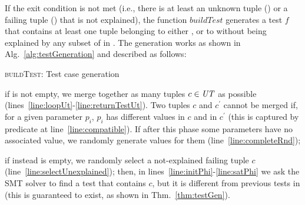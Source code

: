 \begin{tikzborder}{\cite{Gargantini16:validation}}
\begin{tikzborder}{\cite{gargantini_combinatorial_2017}}
\begin{tikzborder}{\cite{garn2019}}
\begin{tikzborder}{\cite{arcaini2019achieving}}
\begin{tikzborder}{}
If the exit condition is not met (i.e., there is at least an unknown tuple (\ut) or a failing tuple (\ft) that is not explained), the function $\mathit{buildTest}$ generates a test $f$ that contains at least one tuple belonging to either \ut, or to \ft without being explained by any subset of \mfics in \isoMficsSet. The generation works as shown in Alg.~\ref{alg:testGeneration} and described as follows:
\end{tikzborder}
%
\begin{algorithm}[!htb]
	\begin{algorithmic}[1]
		\If{$\ut \neq \emptyset$}
		\label{line:loopUt}
		\label{line:compatible}
		\EndIf
		\State {}
		\EndIf
		\EndFor
		\label{line:completeRnd}
		\State {}\label{line:returnTestUt}
		\Else
		\label{line:selectUnexplained}
		\label{line:initPhi}
		\label{line:satPhi}
		\EndIf
	\end{algorithmic}
	\caption{\textsc{buildTest}: Test case generation}
	\label{alg:testGeneration}
\end{algorithm}
%
\begin{tikzborder}{}
\begin{compactitem}
	\item if \ut is not empty, we merge together as many tuples $c \in \mathit{UT}$ as possible (lines~\ref{line:loopUt}-\ref{line:returnTestUt}). Two tuples $c$ and $c^\prime$ cannot be merged if, for a given parameter $p_i$, $p_i$ has different values in $c$ and in $c^\prime$ (this is captured by predicate \compatible at line~\ref{line:compatible}). If after this phase some parameters have no associated value, we randomly generate values for them (line~\ref{line:completeRnd});
	\item if instead \ut is empty, we randomly select a not-explained failing tuple $c$ (line~\ref{line:selectUnexplained}); then, in lines~\ref{line:initPhi}-\ref{line:satPhi} we ask the SMT solver to find a test that contains $c$, but it is different from previous tests in \ts (this is guaranteed to exist, as shown in Thm.~\ref{thm:testGen}).
\end{compactitem}
\end{tikzborder}


\end{tikzborder}
\end{tikzborder}
\end{tikzborder}
\end{tikzborder}

